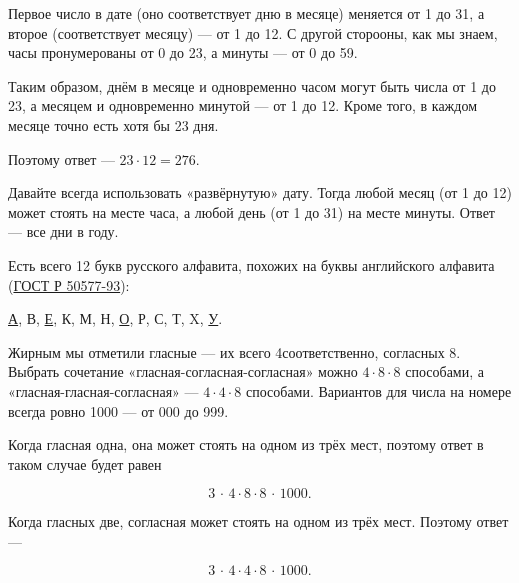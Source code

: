 \begin{itemize}
\itA Первое число в дате (оно соответствует дню в месяце) меняется от 1 до 31, а второе (соответствует месяцу) — от 1 до 12. С другой сторооны, как мы знаем, часы пронумерованы от 0 до 23, а минуты — от 0 до 59.

\ms Таким образом, днём в месяце и одновременно часом могут быть числа от 1 до 23, а месяцем и одновременно минутой — от 1 до 12. Кроме того, в каждом месяце точно есть хотя бы 23 дня.

\ms Поэтому ответ — $23 \cdot 12 = 276$.

\itB Давайте всегда использовать «развёрнутую» дату. Тогда любой месяц (от 1 до 12) может стоять на месте часа, а любой день (от 1 до 31) на месте минуты. Ответ — все дни в году.

\itC Есть всего 12 букв русского алфавита, похожих на буквы английского алфавита (\href{http://base.garant.ru/12142212}{ГОСТ Р 50577-93}): \medskip

\centerline{{\underline А}, В, {\underline Е}, К, М, Н, {\underline О}, Р, С, Т, X, {\underline У}.}

\ms Жирным мы отметили гласные — их всего 4\scolon соответственно, согласных 8. Выбрать сочетание «гласная-согласная-согласная» можно $4 \cdot 8 \cdot 8$ способами, а «гласная-гласная-согласная» — $4 \cdot 4 \cdot 8$ способами. Вариантов для числа на номере всегда ровно 1000 — от 000 до 999.

\ms Когда гласная одна, она может стоять на одном из трёх мест, поэтому ответ в таком случае будет равен

$$3\,\cdot\,4\cdot8\cdot8\,\cdot\,1000.$$

\ms Когда гласных две, согласная может стоять на одном из трёх мест. Поэтому ответ —

$$3\,\cdot\,4\cdot4\cdot8\,\cdot\,1000.$$
\end{itemize}
